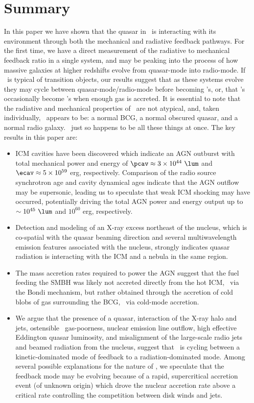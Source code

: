 \documentclass[useAMS,usenatbib]{mn2e}
\begin{document}
\section{Summary}
\label{sec:summ}

In this paper we have shown that the quasar in \inine\ is interacting
with its environment through both the mechanical and radiative
feedback pathways. For the first time, we have a direct measurement of
the radiative to mechanical feedback ratio in a single system, and may
be peaking into the process of how massive galaxies at higher
redshifts evolve from quasar-mode into radio-mode. If \irs\ is typical
of transition objects, our results suggest that as these systems
evolve they may cycle between quasar-mode/radio-mode before becoming
\fri's, or, that \fri's occasionally become \frii's when enough gas is
accreted. It is essential to note that the radiative and mechanical
properties of \irs\ are not atypical, and, taken individually,
\irs\ appears to be: a normal BCG, a normal obscured quasar, and a
normal radio galaxy. \irs\ just so happens to be all these things at
once. The key results in this paper are:
\begin{itemize}
\item ICM cavities have been discovered which indicate an AGN outburst
  with total mechanical power and energy of $\pcav \approx 3 \times
  10^{44} ~\lum$ and $\ecav \approx 5 \times 10^{59}$ erg,
  respectively. Comparison of the radio source synchrotron age and
  cavity dynamical ages indicate that the AGN outflow may be
  supersonic, leading us to speculate that weak ICM shocking may have
  occurred, potentially driving the total AGN power and energy output
  up to $\sim 10^{45} ~\lum$ and $10^{60}$ erg, respectively.
\item Detection and modeling of an X-ray excess northeast of the
  nucleus, which is co-spatial with the quasar beaming direction and
  several multiwavelength emission features associated with the
  nucleus, strongly indicates quasar radiation is interacting with the
  ICM and a nebula in the same region.
\item The mass accretion rates required to power the AGN suggest that
  the fuel feeding the SMBH was likely not accreted directly from the
  hot ICM, \ie\ via the Bondi mechanism, but rather obtained through
  the accretion of cold blobs of gas surrounding the BCG, \ie\ via
  cold-mode accretion.
\item We argue that the presence of a quasar, interaction of the X-ray
  halo and jets, ostensible \irs\ gas-poorness, nuclear emission line
  outflow, high effective Eddington quasar luminosity, and
  misalignment of the large-scale radio jets and beamed radiation from
  the nucleus, suggest that \irs\ is cycling between a
  kinetic-dominated mode of feedback to a radiation-dominated
  mode. Among several possible explanations for the nature of \irs, we
  speculate that the feedback mode may be evolving because of a rapid,
  supercritical accretion event (of unknown origin) which drove the
  nuclear accretion rate above a critical rate controlling the
  competition between disk winds and jets.
\end{itemize}
\end{document}
